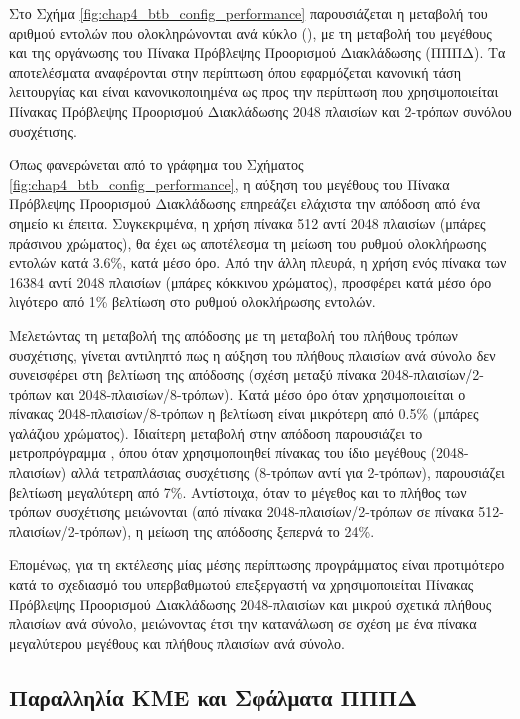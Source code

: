 Στο Σχήμα \ref{fig:chap4_btb_config_performance} παρουσιάζεται η μεταβολή του αριθμού εντολών που ολοκληρώνονται ανά κύκλο (\ipc), με τη μεταβολή του μεγέθους και της οργάνωσης του Πίνακα Πρόβλεψης Προορισμού Διακλάδωσης (ΠΠΠΔ). Τα αποτελέσματα αναφέρονται στην περίπτωση όπου εφαρμόζεται κανονική τάση λειτουργίας και είναι κανονικοποιημένα ως προς την περίπτωση που χρησιμοποιείται Πίνακας Πρόβλεψης Προορισμού Διακλάδωσης 2048 πλαισίων και 2-τρόπων συνόλου συσχέτισης.
\par
Όπως φανερώνεται από το γράφημα του Σχήματος \ref{fig:chap4_btb_config_performance}, η αύξηση του μεγέθους του Πίνακα Πρόβλεψης Προορισμού Διακλάδωσης επηρεάζει ελάχιστα την απόδοση από ένα σημείο κι έπειτα. Συγκεκριμένα, η χρήση πίνακα 512 αντί 2048 πλαισίων (μπάρες πράσινου χρώματος), θα έχει ως αποτέλεσμα τη μείωση του ρυθμού ολοκλήρωσης εντολών κατά 3.6\%, κατά μέσο όρο. Από την άλλη πλευρά, η χρήση ενός πίνακα των 16384 αντί 2048 πλαισίων (μπάρες κόκκινου χρώματος), προσφέρει κατά μέσο όρο λιγότερο από 1\% βελτίωση στο ρυθμού ολοκλήρωσης εντολών.
\par
Μελετώντας τη μεταβολή της απόδοσης με τη μεταβολή του πλήθους τρόπων συσχέτισης, γίνεται αντιληπτό πως η αύξηση του πλήθους πλαισίων ανά σύνολο δεν συνεισφέρει στη βελτίωση της απόδοσης (σχέση μεταξύ πίνακα 2048-πλαισίων/2-τρόπων και 2048-πλαισίων/8-τρόπων). Κατά μέσο όρο όταν χρησιμοποιείται ο πίνακας 2048-πλαισίων/8-τρόπων η βελτίωση είναι μικρότερη από 0.5\% (μπάρες γαλάζιου χρώματος). Ιδιαίτερη μεταβολή στην απόδοση παρουσιάζει το μετροπρόγραμμα , όπου όταν χρησιμοποιηθεί πίνακας του ίδιο μεγέθους (2048-πλαισίων) αλλά τετραπλάσιας συσχέτισης (8-τρόπων αντί για 2-τρόπων), παρουσιάζει βελτίωση μεγαλύτερη από 7\%. Αντίστοιχα, όταν το μέγεθος και το πλήθος των τρόπων συσχέτισης μειώνονται (από πίνακα 2048-πλαισίων/2-τρόπων σε πίνακα 512-πλαισίων/2-τρόπων), η μείωση της απόδοσης ξεπερνά το 24\%.
\par
Επομένως, για τη εκτέλεσης μίας μέσης περίπτωσης προγράμματος είναι προτιμότερο κατά το σχεδιασμό του υπερβαθμωτού επεξεργαστή να χρησιμοποιείται Πίνακας Πρόβλεψης Προορισμού Διακλάδωσης 2048-πλαισίων και μικρού σχετικά πλήθους πλαισίων ανά σύνολο, μειώνοντας έτσι την κατανάλωση σε σχέση με ένα πίνακα μεγαλύτερου μεγέθους και πλήθους πλαισίων ανά σύνολο.


\subsection{Παραλληλία ΚΜΕ και Σφάλματα ΠΠΠΔ}
\label{chap4_CoreConfigIPC}

